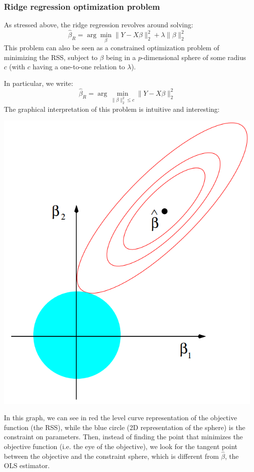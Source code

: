 \documentclass[12pt]{report}
\begin{document}
\subsubsection{Ridge regression optimization problem}

As stressed above, the ridge regression revolves around solving:
$$\hat\beta_R = \arg\min_\beta \lVert Y - X\beta \rVert_2^2 + \lambda\lVert \beta\rVert_2^2 $$ This problem can also be seen as a constrained optimization problem of minimizing the RSS, subject to $\beta$ being in a $p$-dimensional sphere of some radius $c$ (with $c$ having a one-to-one relation to $\lambda$).

In particular, we write: $$\hat\beta_R = \arg\min_{\lVert \beta\rVert_2^2\leq c} \lVert Y - X\beta \rVert_2^2 $$
The graphical interpretation of this problem is intuitive and interesting:
\begin{center}
\includegraphics[scale=0.5]{images/ridgegraph.PNG} 
\end{center}
In this graph, we can see in red the level curve representation of the objective function (the RSS), while the blue circle (2D representation of the sphere) is the constraint on parameters. Then, instead of finding the point that minimizes the objective function (i.e. the eye of the objective), we look for the tangent point between the objective and the constraint sphere, which is different from $\hat\beta$, the OLS estimator.
\end{document}
